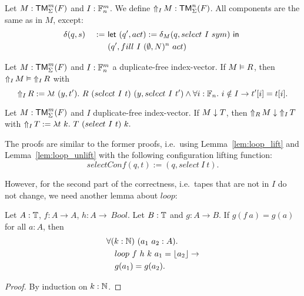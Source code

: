 \begin{definition}[$\LiftTapes{M}{I}$]
  \label{def:LiftTapes}
  Let $M:\TM_\Sigma^m(F)$ and $I : \Fin_n^m$.  We define $\LiftTapes{M}{I} : \TM_\Sigma^n(F)$.  All components are the same as in $M$, except:
  \begin{alignat*}{2}
    &\delta(q,s) &~:=~& \Let{(q', act) := \delta_M(q, select~I~sym)}{\\%
    &            &~  ~& (q', fill~I~(\None,N)^n~act)}
  \end{alignat*}
\end{definition}

\begin{lemma}
  \label{lem:LiftTapes_Realise}
  Let $M : \TM_\Sigma^m(F)$ and $I : \Fin_n^m$ a duplicate-free index-vector.  If $M \Realise R$, then $\LiftTapes{M}{I} \Realise \LiftTapes{R}{I}$ with
  \[
    \LiftTapes{R}{I} := \lambda t~(y,t').~ R~(select~I~t)~(y, select~I~t') \land \forall i:\Fin_n.~i \notin I \rightarrow t'[i]=t[i].
  \]
\end{lemma}

\begin{lemma}
  \label{lem:LiftTapes_TerminatesIn}
  Let $M : \TM_\Sigma^m(F)$ and $I$ duplicate-free index-vector. If $M \TerminatesIn T$, then $\LiftTapes{M}{R} \TerminatesIn \LiftTapes{T}{I}$ with
  $
    \LiftTapes{T}{I} := \lambda t~k.~ T~(select~I~t)~k.
  $
\end{lemma}

The proofs are similar to the former proofs, i.e.\ using Lemma~\ref{lem:loop_lift} and Lemma~\ref{lem:loop_unlift} with the following configuration
lifting function:
\[
  selectConf(q,t) := (q, select~I~t).
\]

However, for the second part of the correctness, i.e.\ tapes that are not in $I$ do not change, we need another lemma about $loop$:

\begin{lemma}
  \label{lem:loop_map}
  Let $A:\Type$, $f:A \to A$, $h:A \to\ Bool$.  Let $B:\Type$ and $g : A \to B$.  If $g(f~a)=g(a)$ for all $a:A$, then
  \begin{alignat*}{1}
    & \forall (k:\Nat)~(a_1~a_2 : A). \\
    & \quad loop~f~h~k~a_1 = \Some{a_2} \rightarrow \\
    & \quad g(a_1) = g(a_2).
  \end{alignat*}
\end{lemma}
\begin{proof}
  By induction on $k:\Nat$.
\end{proof}

